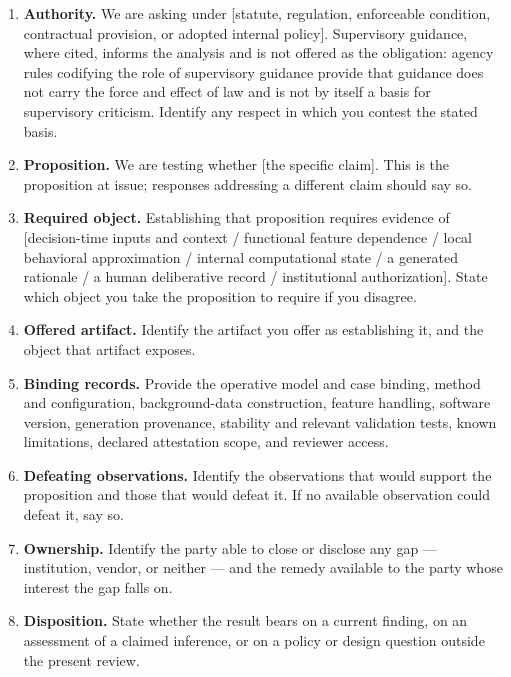 \begin{enumerate}
  \item \textbf{Authority.} We are asking under [statute, regulation,
        enforceable condition, contractual provision, or adopted internal
        policy]. Supervisory guidance, where cited, informs the analysis and
        is not offered as the obligation: agency rules codifying the role of
        supervisory guidance provide that guidance does not carry the force
        and effect of law and is not by itself a basis for supervisory
        criticism. Identify any respect in which you contest the stated basis.
  \item \textbf{Proposition.} We are testing whether [the specific claim]. This
        is the proposition at issue; responses addressing a different claim
        should say so.
  \item \textbf{Required object.} Establishing that proposition requires
        evidence of [decision-time inputs and context / functional feature
        dependence / local behavioral approximation / internal computational
        state / a generated rationale / a human deliberative record /
        institutional authorization]. State which object you take the
        proposition to require if you disagree.
  \item \textbf{Offered artifact.} Identify the artifact you offer as
        establishing it, and the object that artifact exposes.
  \item \textbf{Binding records.} Provide the operative model and case binding,
        method and configuration, background-data construction, feature
        handling, software version, generation provenance, stability and
        relevant validation tests, known limitations, declared attestation
        scope, and reviewer access.
  \item \textbf{Defeating observations.} Identify the observations that would
        support the proposition and those that would defeat it. If no available
        observation could defeat it, say so.
  \item \textbf{Ownership.} Identify the party able to close or disclose any
        gap --- institution, vendor, or neither --- and the remedy available to
        the party whose interest the gap falls on.
  \item \textbf{Disposition.} State whether the result bears on a current
        finding, on an assessment of a claimed inference, or on a policy or
        design question outside the present review.
\end{enumerate}

